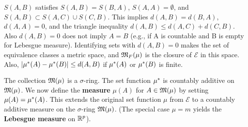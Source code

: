 \begin{remark}
  \label{rem:chap11:distance_properties}
  $S(A, B)$ satisfies $S(A,B)=S(B,A)$, $S(A,A)=\emptyset$, and
  $S(A,B) \subset S(A,C) \cup S(C,B)$. This implies $d(A,B)=d(B,A)$,
  $d(A,A)=0$, and the triangle inequality $d(A,B) \le d(A,C) +
  d(C,B)$. Also $d(A, B)=0$ does not imply $A=B$ (e.g., if A is
  countable and B is empty for Lebesgue measure). Identifying sets
  with $d(A,B)=0$ makes the set of equivalence classes a metric
  space, and $\mathfrak{M}_F(\mu)$ is the closure of $\mathcal{E}$ in
  this space. Also, $|\mu^*(A) - \mu^*(B)| \le d(A,B)$ if
  $\mu^*(A)$ or $\mu^*(B)$ is finite.
\end{remark}

\begin{theorem}
  \label{thm:chap11:measurable_sets_extension}
  The collection $\mathfrak{M}(\mu)$ is a $\sigma$-ring. The set
  function $\mu^*$ is countably additive on $\mathfrak{M}(\mu)$.
  We now define the \textbf{measure} $\mu(A)$ for $A \in
  \mathfrak{M}(\mu)$ by setting $\mu(A) = \mu^*(A)$. This extends
  the original set function $\mu$ from $\mathcal{E}$ to a countably
  additive measure on the $\sigma$-ring $\mathfrak{M}(\mu)$.
  (The special case $\mu=m$ yields the \textbf{Lebesgue measure} on $\mathbb{R}^p$).
\end{theorem}

